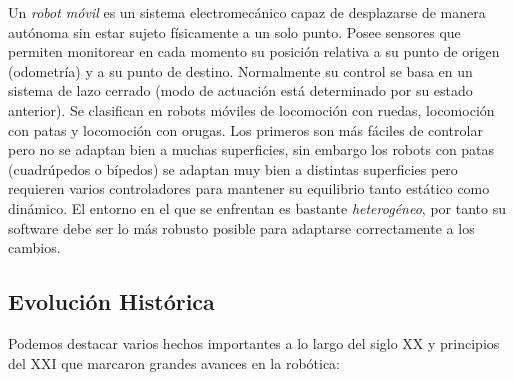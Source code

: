 Un \textit{robot móvil} es un sistema electromecánico capaz de desplazarse de ma­nera autónoma sin estar sujeto físicamente a un solo punto\cite{robots-moviles-evolucion-estado-arte}. Posee sensores que permiten monitorear en cada momento su posición relativa a su punto de origen (odometría) y a su punto de destino. Normalmente su control se basa en un sistema de lazo cerrado (modo de actuación está determinado por su estado anterior). Se clasifican en robots móviles de locomoción con ruedas, locomoción con patas y locomoción con orugas.  Los primeros son más fáciles de controlar pero no se adaptan bien a muchas superficies, sin embargo los robots con patas (cuadrúpedos o bípedos) se adaptan muy bien a distintas superficies pero requieren varios controladores para mantener su equilibrio tanto estático como dinámico. El entorno en el que se enfrentan es bastante \textit{heterogéneo}, por tanto su software debe ser lo más robusto posible para adaptarse correctamente a los cambios.\\




\subsection{Evolución Histórica}
\label{subsec:evolucion_historica}

Podemos destacar varios hechos importantes a lo largo del siglo XX y principios del XXI que 
marcaron grandes avances en la robótica:

